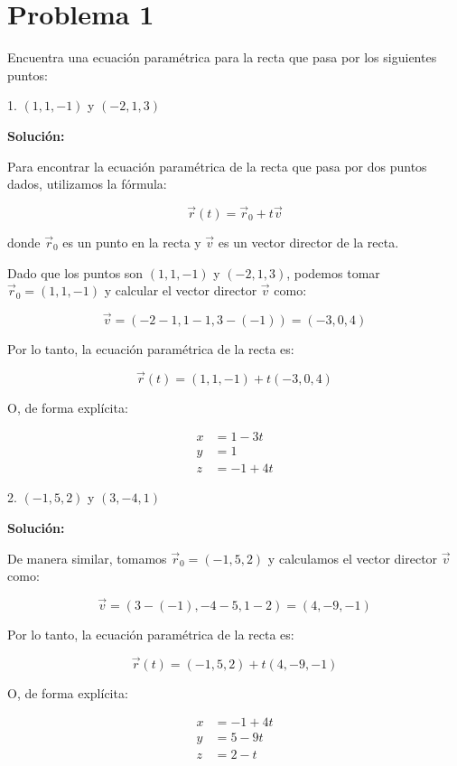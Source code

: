 \section*{Problema 1}

Encuentra una ecuación paramétrica para la recta que pasa por los siguientes puntos:

1. $(1, 1, -1)$ y $(-2, 1, 3)$

\textbf{Solución:}

Para encontrar la ecuación paramétrica de la recta que pasa por dos puntos dados, utilizamos la fórmula:

\[
\vec{r}(t) = \vec{r}_0 + t \vec{v}
\]

donde $\vec{r}_0$ es un punto en la recta y $\vec{v}$ es un vector director de la recta.

Dado que los puntos son $(1, 1, -1)$ y $(-2, 1, 3)$, podemos tomar $\vec{r}_0 = (1, 1, -1)$ y calcular el vector director $\vec{v}$ como:

\[
\vec{v} = (-2 - 1, 1 - 1, 3 - (-1)) = (-3, 0, 4)
\]

Por lo tanto, la ecuación paramétrica de la recta es:

\[
\vec{r}(t) = (1, 1, -1) + t(-3, 0, 4)
\]

O, de forma explícita:

\[
\begin{aligned}
    x &= 1 - 3t \\
    y &= 1 \\
    z &= -1 + 4t
\end{aligned}
\]

2. $(-1, 5, 2)$ y $(3, -4, 1)$

\textbf{Solución:}

De manera similar, tomamos $\vec{r}_0 = (-1, 5, 2)$ y calculamos el vector director $\vec{v}$ como:

\[
\vec{v} = (3 - (-1), -4 - 5, 1 - 2) = (4, -9, -1)
\]

Por lo tanto, la ecuación paramétrica de la recta es:

\[
\vec{r}(t) = (-1, 5, 2) + t(4, -9, -1)
\]

O, de forma explícita:

\[
\begin{aligned}
    x &= -1 + 4t \\
    y &= 5 - 9t \\
    z &= 2 - t
\end{aligned}
\]
